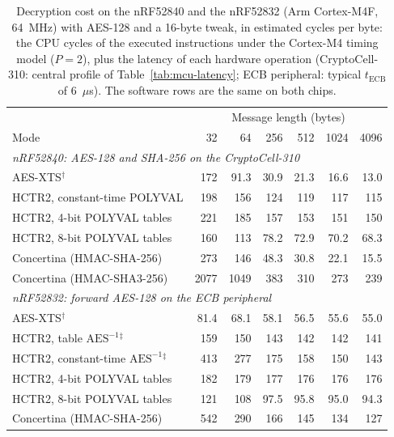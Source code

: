 \begin{table}[!hbt]
\caption{Decryption cost on the nRF52840 and the nRF52832 (Arm Cortex-M4F, 64~MHz) with AES-128 and a 16-byte tweak, in estimated cycles per byte: the CPU cycles of the executed instructions under the Cortex-M4 timing model ($P = 2$), plus the latency of each hardware operation (CryptoCell-310: central profile of Table~\ref{tab:mcu-latency}; ECB peripheral: typical $t_\mathrm{ECB}$ of 6~$\mu$s). The software rows are the same on both chips.}
\label{tab:mcu-dec}
\centering
\small
\renewcommand{\arraystretch}{1.25}
\setlength{\tabcolsep}{4pt}
\begin{tabular}{lrrrrrr}
\hline
 & \multicolumn{6}{c}{Message length (bytes)} \\
Mode & 32 & 64 & 256 & 512 & 1024 & 4096 \\
\hline\hline
\multicolumn{7}{l}{\emph{nRF52840: AES-128 and SHA-256 on the CryptoCell-310}} \\
AES-XTS$^\dagger$                                    & 172 & 91.3 & 30.9 & 21.3 & 16.6 & 13.0 \\
HCTR2, constant-time POLYVAL                         & 198 & 156 & 124 & 119 & 117 & 115 \\
HCTR2, 4-bit POLYVAL tables                          & 221 & 185 & 157 & 153 & 151 & 150 \\
HCTR2, 8-bit POLYVAL tables                          & 160 & 113 & 78.2 & 72.9 & 70.2 & 68.3 \\
Concertina (HMAC-SHA-256)                            & 273 & 146 & 48.3 & 30.8 & 22.1 & 15.5 \\
Concertina (HMAC-SHA3-256)                           & 2077 & 1049 & 383 & 310 & 273 & 239 \\
\hline
\multicolumn{7}{l}{\emph{nRF52832: forward AES-128 on the ECB peripheral}} \\
AES-XTS$^\dagger$                                    & 81.4 & 68.1 & 58.1 & 56.5 & 55.6 & 55.0 \\
HCTR2, table $\mathrm{AES}^{-1}$$^\ddagger$          & 159 & 150 & 143 & 142 & 142 & 141 \\
HCTR2, constant-time $\mathrm{AES}^{-1}$$^\ddagger$  & 413 & 277 & 175 & 158 & 150 & 143 \\
HCTR2, 4-bit POLYVAL tables                          & 182 & 179 & 177 & 176 & 176 & 176 \\
HCTR2, 8-bit POLYVAL tables                          & 121 & 108 & 97.5 & 95.8 & 95.0 & 94.3 \\
Concertina (HMAC-SHA-256)                            & 542 & 290 & 166 & 145 & 134 & 127 \\

\end{tabular}
\end{table}
